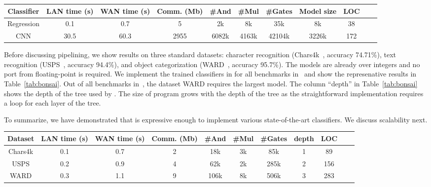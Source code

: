 
\begin{table*}
\begin{tabular}{c|c|c|c |c|c|c|c|c|c | c}
Classifier       & LAN time (s) & WAN time (s) & Comm. (Mb)  & \#And & \#Mul & \#Gates & Model size & LOC\\
\hline
Regression &  0.1         & 0.7         & 5            & 2k    & 8k    &  35k    & 8k   & 38\\
\hline
CNN        &  30.5        & 60.3        & 2955         & 6082k & 4163k &  42104k & 3226k& 172\\
\hline
\end{tabular}

 \caption{Tensorflow tutorial benchmarks}
 \label{tab:tf} 
\end{table*}


Before discussing pipelining, we show \bonsai results on three standard datasets: character recognition (Chars4k~\cite{campos}, accuracy 74.71\%), text recognition (USPS~\cite{hull}, accuracy 94.4\%), and object categorization (WARD~\cite{yang}, accuracy 95.7\%). 
The \bonsai models are already over integers and no port from floating-point is required.
We implement the trained classifiers in \tool for all benchmarks in~\cite{bonsai}
and show the represenative results in Table~\ref{tab:bonsai}.
Out of all benchmarks in~\cite{bonsai}, the dataset WARD requires the largest model.
The column ``depth'' in Table~\ref{tab:bonsai} shows the depth of the tree used by \bonsai. The size of \tool
program grows with the depth of the tree as the straightforward \tool implementation requires a 
loop for each layer of the tree.

To summarize, we have demonstrated that \tool is expressive enough to implement various
state-of-the-art classifiers. We discuss scalability next. 


\begin{table*}
\begin{tabular}{c|c|c|c |c|c|c|c|c|c | c}
Dataset       & LAN time (s) & WAN time (s) & Comm. (Mb)  & \#And & \#Mul & \#Gates & depth & LOC\\
\hline
Chars4k    &  0.1         & 0.7         & 2            & 18k    & 3k    &  85k     & 1   & 89\\
\hline
USPS       &  0.2         & 0.9         & 4            & 62k    & 2k    &  285k    & 2   & 156\\
\hline
WARD       &  0.3         & 1.1         & 9            & 106k    & 8k    &  506k    & 3   & 283\\
\hline
\end{tabular}

 \caption{Bonsai benchmarks}
 \label{tab:bonsai} 
\end{table*}

